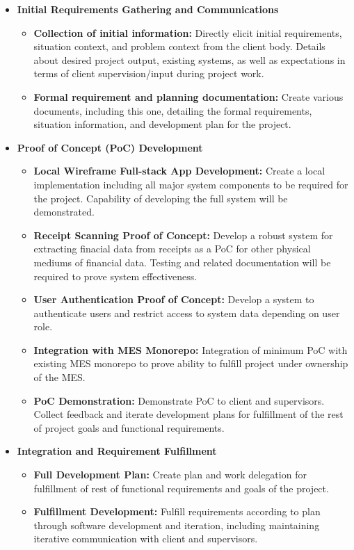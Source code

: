 \documentclass[12pt]{article}
\begin{document}
    \begin{itemize}
      \item \textbf{Initial Requirements Gathering and Communications}
        \begin{itemize}
          \item \textbf{Collection of initial information:} Directly elicit initial requirements, situation context, and problem context from the client body.
          Details about desired project output, existing systems, as well as expectations in terms of client supervision/input during project work.
          \item \textbf{Formal requirement and planning documentation:} Create various documents, including this one, detailing the formal requirements, situation
          information, and development plan for the project.
        \end{itemize}
      \item \textbf{Proof of Concept (PoC) Development}
        \begin{itemize}
          \item \textbf{Local Wireframe Full-stack App Development:} Create a local implementation including all major system components to be required for the project. Capability of developing the full system will be demonstrated.
          \item \textbf{Receipt Scanning Proof of Concept:} Develop a robust system for extracting finacial data from receipts as a PoC for other physical mediums of financial data. Testing and related documentation will be required to prove system effectiveness.
          \item \textbf{User Authentication Proof of Concept:}  Develop a system to authenticate users and restrict access to system data depending on user role.
          \item \textbf{Integration with MES Monorepo:} Integration of minimum PoC with existing MES monorepo to prove ability to fulfill project under ownership of the MES.
          \item \textbf{PoC Demonstration:} Demonstrate PoC to client and supervisors. Collect feedback and iterate development plans for fulfillment of the rest of project goals and functional requirements.
        \end{itemize}
      \item \textbf{Integration and Requirement Fulfillment}
        \begin{itemize}
          \item \textbf{Full Development Plan:} Create plan and work delegation for fulfillment of rest of functional requirements and goals of the project.
          \item \textbf{Fulfillment Development:} Fulfill requirements according to plan through software development and iteration, including maintaining iterative communication with client and supervisors.
        \end{itemize}
    \end{itemize}
\end{document}
